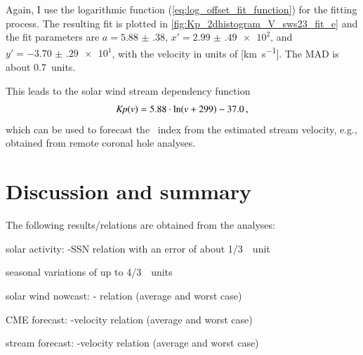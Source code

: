 Again, I use the logarithmic function (\ref{eq:log_offset_fit_function}) for the fitting process. The resulting fit is plotted in \autoref{fig:Kp_2dhistogram_V_sws23_fit_e} and the fit parameters are $a = \num{5.88(38)}$, $x' = \num{2.99(49)e2}$, and $y' = \num{-3.70(29)e1}$, with the velocity in units of [\si{\km\per\s}]. The MAD is about \SI{0.7}{\Kp}~units.
\begin{figure}
\end{figure}
This leads to the solar wind stream dependency function
\begin{align}
	\textit{Kp}(v) = 5.88 \cdot \ln(v + 299) - 37.0	\,,	\label{eq:kpvsv_stream_dependency_function}
\end{align}
which can be used to forecast the \Kp{}~index from the estimated stream velocity, e.g., obtained from remote coronal hole analyses.


\section{Discussion and summary}
The following results/relations are obtained from the analyses:
\begin{itemize*}
	\item solar activity: \Kp{}-SSN relation with an error of about 1/3~\Kp{}~unit
	\item seasonal variations of up to 4/3~\Kp{}~units
	\item solar wind nowcast: \Kp-\vBz{} relation (average and worst case)
	\item CME forecast: \Kp-velocity relation (average and worst case)
	\item stream forecast: \Kp-velocity relation (average and worst case)
\end{itemize*}

